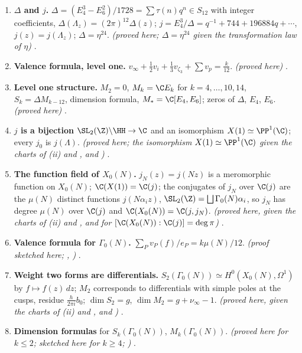 \begin{enumerate}[label=\textbf{\thechapter.\arabic*}]
\item \textbf{$\Delta$ and $j$.} $\Delta=(E_4^3-E_6^2)/1728=\sum\tau(n)q^n\in S_{12}$ with integer coefficients, $\Delta(\Lambda_z)=(2\pi)^{12}\Delta(z)$; $j=E_4^3/\Delta=q^{-1}+744+196884q+\cdots$, $j(z)=j(\Lambda_z)$;
$\Delta=\eta^{24}$. \emph{(proved here; $\Delta=\eta^{24}$ given the transformation law of $\eta$)} .
\item \textbf{Valence formula, level one.} $v_\infty+\frac12v_i+\frac13v_{\zeta_3}+\sum v_p=\frac k{12}$. \emph{(proved here)} .
\item \textbf{Level one structure.} $M_2=0$, $M_k=\C E_k$ for $k=4,\dots,10,14$, $S_k=\Delta M_{k-12}$, dimension formula, $M_*=\C[E_4,E_6]$; zeros of $\Delta$, $E_4$, $E_6$. \emph{(proved here)}
.
\item \textbf{$j$ is a bijection} $\SL_2(\Z)\backslash\HH\to\C$ and an isomorphism $X(1)\simeq\PP^1(\C)$; every $j_0$ is $j(\Lambda)$. \emph{(proved here; the isomorphism $X(1)\simeq\PP^1(\C)$ given the charts of (ii) and , and )} .
\item \textbf{The function field of $X_0(N)$.} $j_N(z)=j(Nz)$ is a meromorphic function on $X_0(N)$; $\C(X(1))=\C(j)$; the conjugates of $j_N$ over $\C(j)$ are the $\mu(N)$ distinct functions
$j(N\alpha_iz)$, $\SL_2(\Z)=\bigsqcup\Gamma_0(N)\alpha_i$, so $j_N$ has degree $\mu(N)$ over $\C(j)$ and $\C(X_0(N))=\C(j,j_N)$. \emph{(proved here, given the charts of (ii) and ,
and  for $[\C(X_0(N)):\C(j)]=\deg\pi$)} .
\item \textbf{Valence formula for $\Gamma_0(N)$.} $\sum_Pv_P(f)/e_P=k\mu(N)/12$. \emph{(proof sketched here; \cite{DiamondShurman}, \cite{Shimura71})} .
\item \textbf{Weight two forms are differentials.} $S_2(\Gamma_0(N))\simeq H^0(X_0(N),\Omega^1)$ by $f\mapsto f(z)\,dz$; $M_2$ corresponds to differentials with simple poles at the cusps, residue
$\frac h{2\pi i}b_0$; $\dim S_2=g$, $\dim M_2=g+\nu_\infty-1$. \emph{(proved here, given the charts of (ii) and , and )} .
\item \textbf{Dimension formulas} for $S_k(\Gamma_0(N))$, $M_k(\Gamma_0(N))$. \emph{(proved here for $k\le2$; sketched here for $k\ge4$; \cite{DiamondShurman})} .

\end{enumerate}
